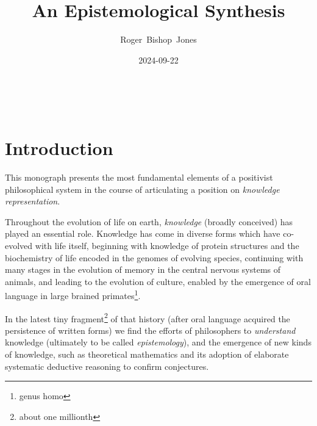 \documentclass[10pt,titlepage]{book}
\title{\bf\LARGE An Epistemological Synthesis}
\author{Roger~Bishop~Jones}
\date{\small 2024-09-22}
\newcommand{\ignore}[1]{}
\begin{document}

%
                               
\begin{titlepage}
\maketitle





\end{titlepage}

\ \

\ignore{
\begin{centering}
{}
\end{centering}
}%

\setcounter{tocdepth}{2}
{\parskip-0pt\tableofcontents}



\chapter{Introduction}

This monograph presents the most fundamental elements of a positivist philosophical system in the course of articulating a position on \emph{knowledge representation}.

Throughout the evolution of life on earth, \emph{knowledge} (broadly  conceived) has played an essential role.
Knowledge has come in diverse forms which have co-evolved with life itself, beginning with knowledge of protein structures and the biochemistry of life encoded in the genomes of evolving species, continuing with many stages in the evolution of memory in the central nervous systems of animals, and leading to the evolution of culture, enabled by the emergence of oral language in large brained primates\footnote{genus homo}.

In the latest tiny fragment\footnote{about one millionth} of that history (after oral language acquired the persistence of written forms) we find the efforts of philosophers to \emph{understand} knowledge (ultimately to be called \emph{epistemology}), and the emergence of new kinds of knowledge, such as theoretical mathematics and its adoption of elaborate systematic deductive reasoning to confirm conjectures.
\end{document}
